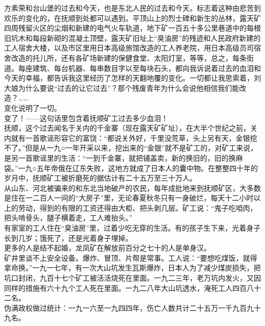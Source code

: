 方素荣和台山堡的过去和今天，也是东北人民的过去和今天。标志着这种由悲苦到欢乐的变化的，在抚顺到处都可以遇到。平顶山上的烈士碑和新生的丛林，露天矿四周残留火区的尘烟和新建的电气火车轨道，地下矿一百五十多公里巷道中的每根旧坑木和每段新砌的混凝土顶壁，露天矿旧址上“臭油房”的残迹和人民政府新建的工人宿舍大楼，以及市区里用日本高级旅馆改造的工人养老院，用日本高级员司宿舍改造的托儿所，还有各矿场新建的保健食堂、太阳灯室，等等，总之，每条街道。每座建筑、每台机器、每串数目字以至每块石头，都向我诉说着过去的血泪和今天的幸福，都告诉我这里经历了怎样的天翻地覆的变化。一切都让我思索着，刘大娘为什么要说“过去的让它过去”？那个残废青年为什么会说他相信我们能改造？……\\

变化说明了一切。\\

变了！——这句话里包含着抚顺矿工过去多少血泪！\\

抚顺，这个过去闻名于关内的千金寨（现在露天矿矿址），在大半个世纪之前，关内就有一首歌谣形容它的富饶：“都说关外好，千里没荒草，头上另有天，金银挖不了。”但是从一九○一年开采以来，挖出来的“金银”就不是矿工的，对矿工来说，是另一首歌谣里的生活：“一到千金寨，就把铺盖卖，新的换旧的，旧的换麻袋。”一九○五年帝俄在辽东失败，这地方就成了日本人的囊中物。在整整四十年的岁月中，抚顺矿工被折磨死的据估计有二十五万至三十万人。\\

从山东、河北被骗来的和东北当地破产的农民，每年成批地来到抚顺矿区，大多数是住在一二百人一间的“大房子”里，无论春夏秋冬只有一身破烂，每天十二小时以上的劳动，得到的有限的工资还得由大柜、把头剥几层。矿工说：“鬼子吃咱肉，把头啃骨头，腿子横着走，工人难抬头。”\\

有家室的工人住在“臭油房”里，过着少吃无穿的生活。有的孩子生下来，光着身子长到几岁；饿死了，还是光着身子埋掉。\\

更多的人是结不起婚，龙凤矿在解放前百分之七十的人是单身汉。\\

矿井里谈不上安全设备。爆炸、冒顶、片帮是常事。工人说：“要想吃煤饭，就得拿命换。”一九一七年，有一次大山坑发生瓦斯爆炸，日本人为了减少煤炭损失，把坑口封闭，九百十七个矿工被活活烧死在里面。一九二三年，老万坑内发火，又因同样的措施有六十九个工人死在里面。一九二八年大山坑透水，淹死工人四百八十二名。\\

伪满政权做过统计：一九一六至一九四四年，伤亡人数共计二十五万一千九百九十九名。\\

